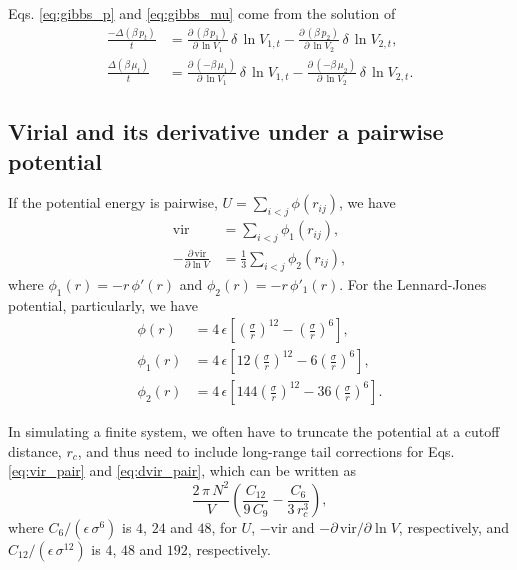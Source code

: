 \documentclass[reprint]{revtex4-1}
\begin{document}
Eqs. \eqref{eq:gibbs_p} and \eqref{eq:gibbs_mu}
come from the solution of
%
\begin{align*}
  \frac{ -\Delta( \beta \, p_t ) } { t }
  &=
  \frac{ \partial \, (\beta \, p_1 ) }
       { \partial \, \ln V_1 }
  \,
  \delta \, \ln V_{1,t}
  -
  \frac{ \partial \, (\beta \, p_2 ) }
       { \partial \, \ln V_2 }
  \,
  \delta \, \ln V_{2,t}
  ,
  \\
  \frac{ \Delta ( \beta \, \mu_t ) } { t }
  &=
  \frac{ \partial \, (-\beta \, \mu_1 ) }
       { \partial \, \ln V_1 }
  \,
  \delta \, \ln V_{1,t}
  -
  \frac{ \partial \, (-\beta \, \mu_2 ) }
       { \partial \, \ln V_2 }
  \,
  \delta \, \ln V_{2,t}
  .
\end{align*}
%

\subsection{Virial and its derivative under a pairwise potential}

If the potential energy is pairwise,
$U = \sum_{i < j} \phi(r_{ij})$,
we have
%
\begin{align}
  \mathrm{vir}
  &=
  \sum_{i < j} \phi_1(r_{ij})
  ,
  \label{eq:vir_pair}
  \\
  -\frac{ \partial \, \mathrm{vir} }
        { \partial \ln V }
  &=
  \frac{1}{3}
  \sum_{i < j} \phi_2(r_{ij})
  ,
  \label{eq:dvir_pair}
\end{align}
%
where $\phi_1(r) = - r \, \phi'(r)$
and $\phi_2(r) = -r \, \phi'_1(r)$.
%
For the Lennard-Jones potential, particularly, we have
%
\begin{align*}
  \phi(r)
  &=
  4 \, \epsilon
  \left[
    \left( \frac{\sigma}{r} \right)^{12}
    -
    \left( \frac{\sigma}{r} \right)^{6}
  \right]
  ,
  \\
  \phi_1(r)
  &=
  4 \, \epsilon
  \left[
    12
    \left( \frac{\sigma}{r} \right)^{12}
    -
    6
    \left( \frac{\sigma}{r} \right)^{6}
  \right]
  ,
  \\
  \phi_2(r)
  &=
  4 \, \epsilon
  \left[
    144
    \left( \frac{\sigma}{r} \right)^{12}
    -
    36
    \left( \frac{\sigma}{r} \right)^{6}
  \right]
  .
\end{align*}

In simulating a finite system,
we often have to truncate the potential at a cutoff distance,
$r_c$, and thus need to include long-range tail corrections
for Eqs. \eqref{eq:vir_pair} and \eqref{eq:dvir_pair},
which can be written as
%
$$
  \frac{ 2 \, \pi \, N^2 } { V }
  \left(
    \frac{ C_{12} } { 9 \, C_9 }
    -
    \frac{ C_6 } { 3 \, r_c^3 }
  \right)
  ,
$$
%
where $C_6/(\epsilon \, \sigma^6)$ is $4$, $24$ and $48$,
for $U$, $-\mathrm{vir}$ and $-\partial\,\mathrm{vir}/\partial \ln V$,
respectively,
and $C_{12}/(\epsilon \, \sigma^{12})$ is
$4$, $48$ and $192$, respectively.


%

\end{document}

